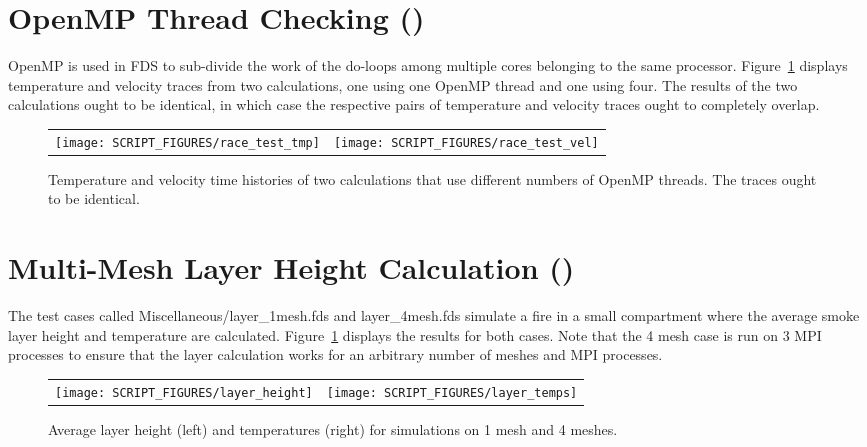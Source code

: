 \documentclass[11pt]{book}
\begin{document}
\newpage

\section{OpenMP Thread Checking (\texorpdfstring{}{race\_test})}
\label{race_test}

OpenMP is used in FDS to sub-divide the work of the do-loops among multiple cores belonging to the same processor. Figure~\ref{race_test_fig} displays temperature and velocity traces from two calculations, one using one OpenMP thread and one using four. The results of the two calculations ought to be identical, in which case the respective pairs of temperature and velocity traces ought to completely overlap.

\begin{figure}[!ht]
\begin{tabular*}{\textwidth}{lr}
\texttt{[image: SCRIPT\_FIGURES/race\_test\_tmp]} &
\texttt{[image: SCRIPT\_FIGURES/race\_test\_vel]}
\end{tabular*}
\caption[Result of the ]{Temperature and velocity time histories of two calculations that use different numbers of OpenMP threads. The traces ought to be identical.}
\label{race_test_fig}
\end{figure}


\newpage

\section{Multi-Mesh Layer Height Calculation (\texorpdfstring{}{layer})}
\label{layer}

The test cases called {\ct Miscellaneous/layer\_1mesh.fds} and {\ct layer\_4mesh.fds} simulate a fire in a small compartment where the average smoke layer height and temperature are calculated. Figure~\ref{race_test_fig} displays the results for both cases. Note that the 4 mesh case is run on 3 MPI processes to ensure that the layer calculation works for an arbitrary number of meshes and MPI processes.

\begin{figure}[!ht]
\begin{tabular*}{\textwidth}{lr}
\texttt{[image: SCRIPT\_FIGURES/layer\_height]} &
\texttt{[image: SCRIPT\_FIGURES/layer\_temps]}
\end{tabular*}
\caption[Result of the  test cases]{Average layer height (left) and temperatures (right) for simulations on 1 mesh and 4 meshes.}
\label{layer_fig}
\end{figure}
\end{document}
